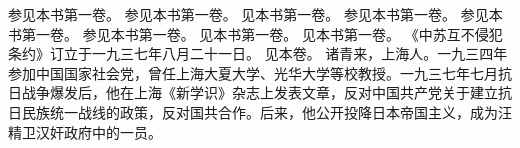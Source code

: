 \begin{maonote}
参见本书第一卷。
参见本书第一卷。
见本书第一卷。
参见本书第一卷。
参见本书第一卷。
参见本书第一卷。
见本书第一卷。
见本书第一卷。
《中苏互不侵犯条约》订立于一九三七年八月二十一日。
见本卷。
诸青来，上海人。一九三四年参加中国国家社会党，曾任上海大夏大学、光华大学等校教授。一九三七年七月抗日战争爆发后，他在上海《新学识》杂志上发表文章，反对中国共产党关于建立抗日民族统一战线的政策，反对国共合作。后来，他公开投降日本帝国主义，成为汪精卫汉奸政府中的一员。
\end{maonote}
